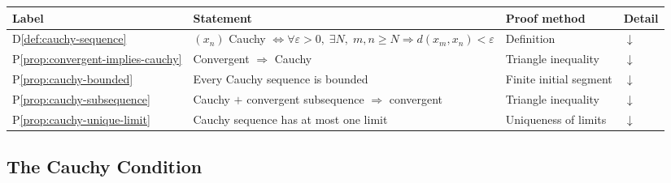 %


\begin{tcolorbox}[colback=gray!6, colframe=gray!40, arc=2pt,
  left=6pt, right=6pt, top=4pt, bottom=4pt,
  title={\small\textbf{Cauchy Sequences --- Quick Reference}},
  fonttitle=\small\bfseries]
\small
\begin{tabular}{l l l l}
\toprule
\textbf{Label} & \textbf{Statement} & \textbf{Proof method} & \textbf{Detail} \\
\midrule
D\ref{def:cauchy-sequence}
  & $(x_n)$ Cauchy $\iff \forall\varepsilon>0,\;\exists N,\;m,n\ge N \Rightarrow d(x_m,x_n)<\varepsilon$
  & Definition
  & \hyperref[def:cauchy-sequence]{$\downarrow$} \\[4pt]
P\ref{prop:convergent-implies-cauchy}
  & Convergent $\Rightarrow$ Cauchy
  & Triangle inequality
  & \hyperref[prop:convergent-implies-cauchy]{$\downarrow$} \\[4pt]
P\ref{prop:cauchy-bounded}
  & Every Cauchy sequence is bounded
  & Finite initial segment
  & \hyperref[prop:cauchy-bounded]{$\downarrow$} \\[4pt]
P\ref{prop:cauchy-subsequence}
  & Cauchy $+$ convergent subsequence $\Rightarrow$ convergent
  & Triangle inequality
  & \hyperref[prop:cauchy-subsequence]{$\downarrow$} \\[4pt]
P\ref{prop:cauchy-unique-limit}
  & Cauchy sequence has at most one limit
  & Uniqueness of limits
  & \hyperref[prop:cauchy-unique-limit]{$\downarrow$} \\[4pt]
\bottomrule
\end{tabular}
\end{tcolorbox}

\subsection{The Cauchy Condition}
\label{sec:cauchy-condition}

